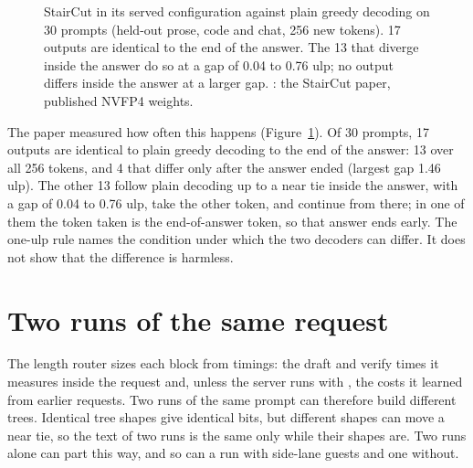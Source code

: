 \begin{figure}[htbp]
\centering
{}
\caption[Agreement with plain greedy decoding]{StairCut in its served configuration against plain greedy decoding on 30 prompts (held-out prose, code and chat, 256 new tokens). 17 outputs are identical to the end of the answer. The 13 that diverge inside the answer do so at a gap of 0.04 to 0.76 ulp; no output differs inside the answer at a larger gap. \measured: the StairCut paper, published NVFP4 weights.}\label{fig:agreement}
\end{figure}

The paper measured how often this happens (Figure~\ref{fig:agreement}). Of 30 prompts, 17 outputs are identical to plain greedy decoding to the end of the answer: 13 over all 256 tokens, and 4 that differ only after the answer ended (largest gap 1.46 ulp). The other 13 follow plain decoding up to a near tie inside the answer, with a gap of 0.04 to 0.76 ulp, take the other token, and continue from there; in one of them the token taken is the end-of-answer token, so that answer ends early. The one-ulp rule names the condition under which the two decoders can differ. It does not show that the difference is harmless.

\section{Two runs of the same request}\label{sec:two-runs}

The length router sizes each block from timings: the draft and verify times it measures inside the request and, unless the server runs with , the costs it learned from earlier requests. Two runs of the same prompt can therefore build different trees. Identical tree shapes give identical bits, but different shapes can move a near tie, so the text of two runs is the same only while their shapes are. Two runs alone can part this way, and so can a run with side-lane guests and one without.


